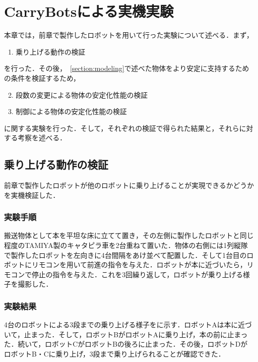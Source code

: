 \chapter{CarryBotsによる実機実験}
本章では，前章で製作したロボットを用いて行った実験について述べる．まず，
\begin{enumerate}
    \item 乗り上げる動作の検証
\end{enumerate}
を行った．その後，~\ref{section:modeling}で述べた物体をより安定に支持するための条件を検証するため，
\begin{enumerate}
    \setcounter{enumi}{1}
    \item 段数の変更による物体の安定化性能の検証
    \item 制御による物体の安定化性能の検証
\end{enumerate}
に関する実験を行った．そして，それぞれの検証で得られた結果と，それらに対する考察を述べる．

\section{乗り上げる動作の検証}
前章で製作したロボットが他のロボットに乗り上げることが実現できるかどうかを実機検証した．

\subsection{実験手順}
搬送物体として本を平坦な床に立てて置き，その左側に製作したロボットと同じ程度のTAMIYA製のキャタピラ車を2台重ねて置いた．物体の右側には1列縦隊で製作したロボットを左向きに4台間隔をあけ並べて配置した．そして1台目のロボットにリモコンを用いて前進の指令を与えた．ロボットが本に近づいたら，リモコンで停止の指令を与えた．これを3回繰り返して，ロボットが乗り上げる様子を撮影した．

\subsection{実験結果}
4台のロボットによる3段までの乗り上げる様子をに示す．ロボットAは本に近づいて，止まった．そして，ロボットBがロボットAに乗り上げ，本の前に止まった．続いて，ロボットCがロボットBの後ろに止まった．その後，ロボットDがロボットB・Cに乗り上げ，3段まで乗り上げられることが確認できた．

